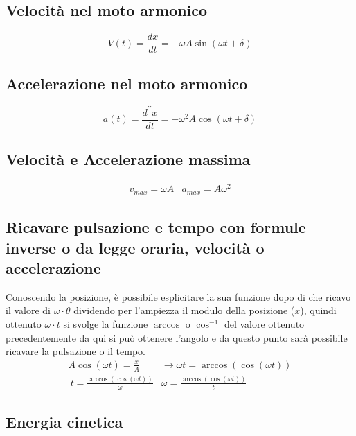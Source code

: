 \documentclass{book}
\begin{document}
\subsection{Velocità nel moto armonico}
\label{sec:velnelmotarmon}
\begin{equation}
  \label{eq:velnelmotarmon}
  V(t)=\frac{dx}{dt}=-\omega A\sin (\omega t +\delta)
\end{equation}

\subsection{Accelerazione nel moto armonico}
\label{sec:accnelmotarm}

\begin{equation}
  \label{eq:accnelmotarm}
  a(t)=\frac{d^{\prime\prime}x}{dt}=-\omega^2 A\cos (\omega t +\delta)
\end{equation}

\subsection{Velocità e Accelerazione massima}
\label{sec:velAccmass}

\begin{eqnarray}
  \label{eq:velAccmassArm}
  v_{max}=\omega A & a_{max}=A\omega^2
\end{eqnarray}
\subsection{Ricavare pulsazione e tempo con formule inverse o da legge oraria, velocità o accelerazione}
\label{sec:ricpulslegore}

Conoscendo la posizione, è possibile esplicitare la sua funzione dopo di che ricavo il valore di $\omega \cdot \theta$ dividendo per l'ampiezza il modulo della posizione ($x$), quindi ottenuto $\omega\cdot t$ si svolge la funzione $\arccos$ o $\cos^{-1}$ del valore ottenuto precedentemente da qui si può ottenere l'angolo e da questo punto sarà possibile ricavare la pulsazione o il tempo.
\begin{eqnarray}
  \label{eq:ricpulslegore}
  A\cos(\omega t)=\frac{x}{A} & \to \omega t=\arccos(\cos(\omega t))\\
  \ t = \frac{\arccos(\cos(\omega t))}{\omega} & \omega=\frac{\arccos(\cos(\omega t))}{t} 
\end{eqnarray}
\subsection{Energia cinetica}
\label{sec:encin}
\end{document}
